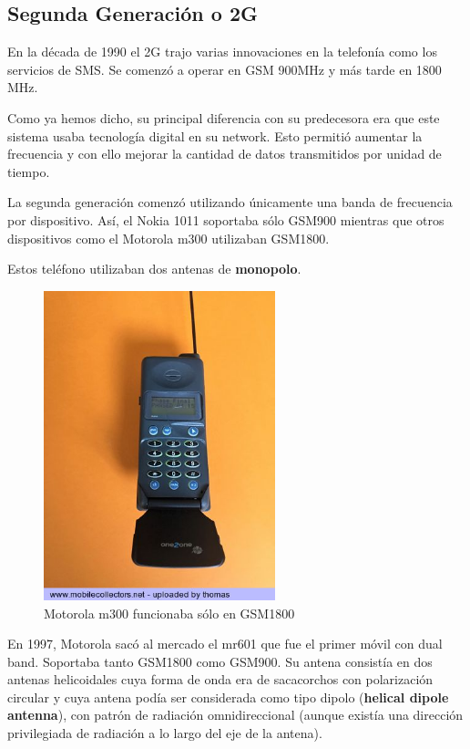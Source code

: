 \documentclass[a4paper,11pt,titlepage]{article}
\begin{document}
\subsection{Segunda Generación o 2G}
En la década de 1990 el 2G trajo varias innovaciones en la telefonía como los servicios de SMS. Se comenzó a operar en GSM 900MHz y más tarde en 1800 MHz.\par
Como ya hemos dicho, su principal diferencia con su predecesora era que este sistema usaba tecnología digital en su network. Esto permitió aumentar la frecuencia y con ello mejorar la cantidad de datos transmitidos por unidad de tiempo.\par
La segunda generación comenzó utilizando únicamente una banda de frecuencia por dispositivo. Así, el Nokia 1011 soportaba sólo GSM900 mientras que otros dispositivos como el Motorola m300 utilizaban GSM1800.\par
Estos teléfono utilizaban dos antenas de \textbf{monopolo}.
\begin{figure}[h]
\centering
\includegraphics[width=0.6\textwidth]{motorolam300}
\caption{Motorola m300 funcionaba sólo en GSM1800}
\label{motorolam300}
\end{figure}
\par
En 1997, Motorola sacó al mercado el mr601 que fue el primer móvil con dual band. Soportaba tanto GSM1800 como GSM900. Su antena consistía en dos antenas helicoidales cuya forma de onda era de sacacorchos con polarización circular y cuya antena podía ser considerada como tipo dipolo (\textbf{helical dipole antenna}), con patrón de radiación omnidireccional (aunque existía una dirección privilegiada de radiación a lo largo del eje de la antena).
\end{document}
